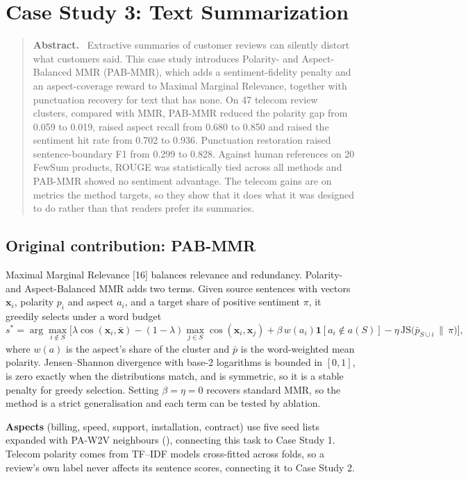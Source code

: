 \documentclass[11pt,a4paper]{article}
\newcommand{\repo}{https://github.com/BharatChandra-sys/NLP-case-study}
\newcommand{\repolink}[2]{\href{\repo/blob/main/#1}{\texttt{\detokenize{#2}}}}
\newenvironment{csabstract}{\begin{quote}\small\textbf{Abstract.}\ }{\end{quote}}
\begin{document}
\section{Case Study 3: Text Summarization}\label{sec:sum}
\begin{csabstract}
Extractive summaries of customer reviews can silently distort what customers said. This case study introduces Polarity- and Aspect-Balanced MMR (PAB-MMR), which adds a sentiment-fidelity penalty and an aspect-coverage reward to Maximal Marginal Relevance, together with punctuation recovery for text that has none. On 47 telecom review clusters, compared with MMR, PAB-MMR reduced the polarity gap from 0.059 to 0.019, raised aspect recall from 0.680 to 0.850 and raised the sentiment hit rate from 0.702 to 0.936. Punctuation restoration raised sentence-boundary F1 from 0.299 to 0.828. Against human references on 20 FewSum products, ROUGE was statistically tied across all methods and PAB-MMR showed no sentiment advantage. The telecom gains are on metrics the method targets, so they show that it does what it was designed to do rather than that readers prefer its summaries.
\end{csabstract}
\subsection{Original contribution: PAB-MMR}
Maximal Marginal Relevance [16] balances relevance and redundancy. Polarity- and Aspect-Balanced MMR adds two terms. Given source sentences with vectors $\mathbf{x}_i$, polarity $p_i$ and aspect $a_i$, and a target share of positive sentiment $\pi$, it greedily selects under a word budget
\begin{equation}
s^\ast=\arg\max_{i\notin S}\Big[\lambda\cos(\mathbf{x}_i,\bar{\mathbf{x}})-(1-\lambda)\max_{j\in S}\cos(\mathbf{x}_i,\mathbf{x}_j)+\beta\,w(a_i)\mathbf{1}[a_i\notin a(S)]-\eta\,\mathrm{JS}\big(\bar{p}_{S\cup i}\,\|\,\pi\big)\Big],
\end{equation}
where $w(a)$ is the aspect's share of the cluster and $\bar{p}$ is the word-weighted mean polarity. Jensen--Shannon divergence with base-2 logarithms is bounded in $[0,1]$, is zero exactly when the distributions match, and is symmetric, so it is a stable penalty for greedy selection. Setting $\beta=\eta=0$ recovers standard MMR, so the method is a strict generalisation and each term can be tested by ablation.

\textbf{Aspects} (billing, speed, support, installation, contract) use five seed lists expanded with PA-W2V neighbours (\repolink{results/summarization/aspect_lexicon.json}{aspect_lexicon.json}), connecting this task to Case Study 1. Telecom polarity comes from TF--IDF models cross-fitted across folds, so a review's own label never affects its sentence scores, connecting it to Case Study 2.
\end{document}
